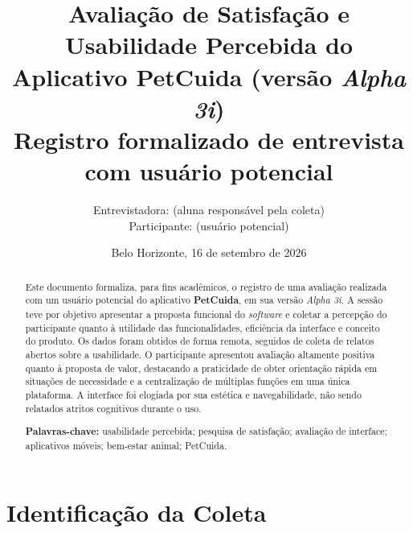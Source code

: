\documentclass[12pt,a4paper]{article}
\title{\textbf{Avaliação de Satisfação e Usabilidade Percebida do\\
Aplicativo PetCuida (versão \textit{Alpha 3i})}\\[0.4cm]
\large Registro formalizado de entrevista com usuário potencial}
\author{Entrevistadora: \entrevistador{} (aluna responsável pela coleta)\\
Participante: \participante{} (usuário potencial)}
\date{Belo Horizonte, 16 de setembro de 2026}
\begin{document}
\maketitle
\thispagestyle{empty}

\begin{abstract}
\noindent Este documento formaliza, para fins acadêmicos, o registro de uma avaliação realizada com um usuário potencial do aplicativo \textbf{PetCuida}, em sua versão \textit{Alpha 3i}. A sessão teve por objetivo apresentar a proposta funcional do \textit{software} e coletar a percepção do participante quanto à utilidade das funcionalidades, eficiência da interface e conceito do produto. Os dados foram obtidos de forma remota, seguidos de coleta de relatos abertos sobre a usabilidade. O participante apresentou avaliação altamente positiva quanto à proposta de valor, destacando a praticidade de obter orientação rápida em situações de necessidade e a centralização de múltiplas funções em uma única plataforma. A interface foi elogiada por sua estética e navegabilidade, não sendo relatados atritos cognitivos durante o uso. 

\vspace{0.4cm}
\noindent\textbf{Palavras-chave:} usabilidade percebida; pesquisa de satisfação; avaliação de interface; aplicativos móveis; bem-estar animal; PetCuida.
\end{abstract}

\newpage
\tableofcontents
\newpage

\section{Identificação da Coleta}
\end{document}
